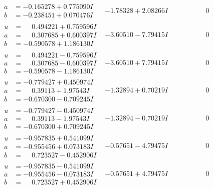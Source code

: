 \documentclass[1p]{elsarticle_modified}
\theoremstyle{definition}
\begin{document}
$$\begin{array}{c|c|c}
\begin{aligned}
a &= -0.165278 + 0.775090 I \\
b &= -0.238451 + 0.070476 I\end{aligned}
 & -1.78328 + 2.08266 I & \phantom{-0.000000 } 0 \\ \hline\begin{aligned}
u &= \phantom{-}0.494221 + 0.759596 I \\
a &= \phantom{-}0.307685 + 0.600397 I \\
b &= -0.590578 + 1.186130 I\end{aligned}
 & -3.60510 - 7.79415 I & \phantom{-0.000000 } 0 \\ \hline\begin{aligned}
u &= \phantom{-}0.494221 - 0.759596 I \\
a &= \phantom{-}0.307685 - 0.600397 I \\
b &= -0.590578 - 1.186130 I\end{aligned}
 & -3.60510 + 7.79415 I & \phantom{-0.000000 } 0 \\ \hline\begin{aligned}
u &= -0.779427 + 0.450974 I \\
a &= \phantom{-}0.39113 + 1.97543 I \\
b &= -0.670300 - 0.709245 I\end{aligned}
 & -1.32894 + 0.70219 I & \phantom{-0.000000 } 0 \\ \hline\begin{aligned}
u &= -0.779427 - 0.450974 I \\
a &= \phantom{-}0.39113 - 1.97543 I \\
b &= -0.670300 + 0.709245 I\end{aligned}
 & -1.32894 - 0.70219 I & \phantom{-0.000000 } 0 \\ \hline\begin{aligned}
u &= -0.957835 + 0.541099 I \\
a &= -0.955456 + 0.073183 I \\
b &= \phantom{-}0.723527 - 0.452906 I\end{aligned}
 & -0.57651 - 4.79475 I & \phantom{-0.000000 } 0 \\ \hline\begin{aligned}
u &= -0.957835 - 0.541099 I \\
a &= -0.955456 - 0.073183 I \\
b &= \phantom{-}0.723527 + 0.452906 I\end{aligned}
 & -0.57651 + 4.79475 I & \phantom{-0.000000 } 0 \\ \hline\begin{aligned}

\end{aligned}
\end{array}$$
\end{document}
